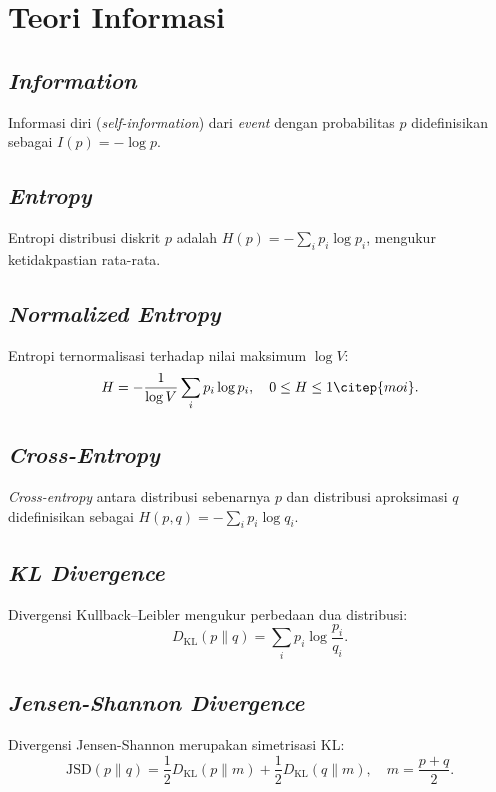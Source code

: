 \section{Teori Informasi}

\subsection{\textit{Information}}
Informasi diri (\textit{self-information}) dari \textit{event} dengan probabilitas \(p\) didefinisikan sebagai \(I(p) = -\log p\).

\subsection{\textit{Entropy}}
Entropi distribusi diskrit \(p\) adalah \(H(p) = -\sum_i p_i \log p_i\), mengukur ketidakpastian rata-rata.

\subsection{\textit{Normalized Entropy}}
Entropi ternormalisasi terhadap nilai maksimum \(\log V\):
\begin{equation}
H = -\frac{1}{\log V} \sum_i p_i \log p_i, \quad 0 \le H \le 1 \citep{moi}.
\end{equation}

\subsection{\textit{Cross-Entropy}}
\textit{Cross-entropy} antara distribusi sebenarnya \(p\) dan distribusi aproksimasi \(q\) didefinisikan sebagai \(H(p,q) = -\sum_i p_i \log q_i\).

\subsection{\textit{KL Divergence}}
Divergensi Kullback–Leibler mengukur perbedaan dua distribusi:
\begin{equation}
D_{\mathrm{KL}}(p \| q) = \sum_i p_i \log \frac{p_i}{q_i}.
\end{equation}

\subsection{\textit{Jensen-Shannon Divergence}}
Divergensi Jensen-Shannon merupakan simetrisasi KL:
\begin{equation}
\mathrm{JSD}(p \| q) = \frac{1}{2} D_{\mathrm{KL}}(p \| m) + \frac{1}{2} D_{\mathrm{KL}}(q \| m), \quad m = \frac{p+q}{2}.
\end{equation}

